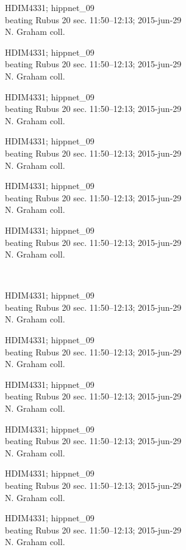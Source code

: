 \documentclass[2pt]{extarticle}
\begin{document}
\noindent
\parbox{0.16\textwidth}{\tiny \raggedright \rule[-0.3\baselineskip]{0pt}{10pt}HDIM4331; hippnet\_09\\ beating Rubus 20 sec. 11:50--12:13; 2015-jun-29\\ N. Graham coll.}
\parbox{0.16\textwidth}{\tiny \raggedright \rule[-0.3\baselineskip]{0pt}{10pt}HDIM4331; hippnet\_09\\ beating Rubus 20 sec. 11:50--12:13; 2015-jun-29\\ N. Graham coll.}
\parbox{0.16\textwidth}{\tiny \raggedright \rule[-0.3\baselineskip]{0pt}{10pt}HDIM4331; hippnet\_09\\ beating Rubus 20 sec. 11:50--12:13; 2015-jun-29\\ N. Graham coll.}
\parbox{0.16\textwidth}{\tiny \raggedright \rule[-0.3\baselineskip]{0pt}{10pt}HDIM4331; hippnet\_09\\ beating Rubus 20 sec. 11:50--12:13; 2015-jun-29\\ N. Graham coll.}
\parbox{0.16\textwidth}{\tiny \raggedright \rule[-0.3\baselineskip]{0pt}{10pt}HDIM4331; hippnet\_09\\ beating Rubus 20 sec. 11:50--12:13; 2015-jun-29\\ N. Graham coll.}
\parbox{0.16\textwidth}{\tiny \raggedright \rule[-0.3\baselineskip]{0pt}{10pt}HDIM4331; hippnet\_09\\ beating Rubus 20 sec. 11:50--12:13; 2015-jun-29\\ N. Graham coll.} \\ 
\vspace{0.001in} 

\noindent
\parbox{0.16\textwidth}{\tiny \raggedright \rule[-0.3\baselineskip]{0pt}{10pt}HDIM4331; hippnet\_09\\ beating Rubus 20 sec. 11:50--12:13; 2015-jun-29\\ N. Graham coll.}
\parbox{0.16\textwidth}{\tiny \raggedright \rule[-0.3\baselineskip]{0pt}{10pt}HDIM4331; hippnet\_09\\ beating Rubus 20 sec. 11:50--12:13; 2015-jun-29\\ N. Graham coll.}
\parbox{0.16\textwidth}{\tiny \raggedright \rule[-0.3\baselineskip]{0pt}{10pt}HDIM4331; hippnet\_09\\ beating Rubus 20 sec. 11:50--12:13; 2015-jun-29\\ N. Graham coll.}
\parbox{0.16\textwidth}{\tiny \raggedright \rule[-0.3\baselineskip]{0pt}{10pt}HDIM4331; hippnet\_09\\ beating Rubus 20 sec. 11:50--12:13; 2015-jun-29\\ N. Graham coll.}
\parbox{0.16\textwidth}{\tiny \raggedright \rule[-0.3\baselineskip]{0pt}{10pt}HDIM4331; hippnet\_09\\ beating Rubus 20 sec. 11:50--12:13; 2015-jun-29\\ N. Graham coll.}
\parbox{0.16\textwidth}{\tiny \raggedright \rule[-0.3\baselineskip]{0pt}{10pt}HDIM4331; hippnet\_09\\ beating Rubus 20 sec. 11:50--12:13; 2015-jun-29\\ N. Graham coll.} \\ 
\vspace{0.001in} 
\end{document}

